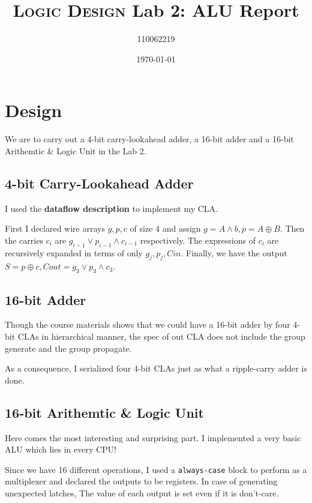 \documentclass[12pt, a4paper]{article}
\title{\textsc{Logic Design} Lab 2: \textsf{ALU} Report}
\author{110062219}
\date{\today}
\begin{document}
\maketitle

\section{Design}

We are to carry out a 4-bit \textsf{carry-lookahead adder}, a 16-bit \textsf{adder} and a 16-bit \textsf{Arithemtic \& Logic Unit} in the Lab 2.

\subsection{4-bit \textsf{Carry-Lookahead Adder}}

I used the \textbf{dataflow description} to implement my \textsf{CLA}.

First I declared wire arrays $g,p,c$ of size 4 and assign $g=A\land b,p=A\oplus B$. Then the carries $c_i$ are $g_{i-1}\lor p_{i-1}\land c_{i-1}$ respectively. The expressions of $c_i$ are recursively expanded in terms of only $g_j,p_j,Cin$. Finally, we have the output $S=p\oplus c,Cout=g_3\lor p_3\land c_3$.

\subsection{16-bit \textsf{Adder}}

Though the course materials shows that we could have a 16-bit \textsf{adder} by four 4-bit \textsf{CLA}s in hierarchical manner, the spec of out \textsf{CLA} does not include the group generate and the group propagate.

As a consequence, I serialized four 4-bit \textsf{CLA}s just as what a ripple-carry adder is done.

\subsection{16-bit \textsf{Arithemtic \& Logic Unit}}

Here comes the most interesting and surprising part. I implemented a very basic \textsf{ALU} which lies in every CPU!

Since we have 16 different operations, I used a \texttt{always-case} block to perform as a multiplexer and declared the outputs to be registers. In case of generating unexpected latches, The value of each output is set even if it is don't-care.
\end{document}
